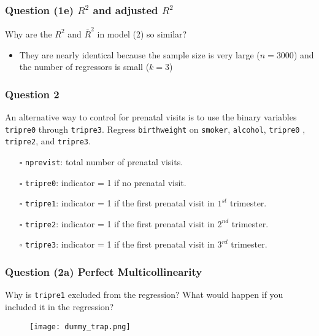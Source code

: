 \documentclass[11pt, xcolor=x11names,compress]{beamer}
\begin{document}
\begin{frame}[fragile,t]
\frametitle{Question (1e) $R^2$ and adjusted $R^2$}
\linespread{1.3}
Why are the $R^2$ and $\bar{R}^2$ in model (2) so similar?

\vspace{10mm}

\begin{itemize}
    \item They are nearly identical because the sample size is very large ($n = 3000$) and the number of regressors is small ($k = 3$)
\end{itemize}
\end{frame}

\begin{frame}[fragile,t]
\frametitle{Question 2}
\linespread{1.3}
An alternative way to control for prenatal visits is to use the binary variables \texttt{tripre0} through \texttt{tripre3}. Regress \texttt{birthweight} on \texttt{smoker}, \texttt{alcohol}, \texttt{tripre0} , \texttt{tripre2}, and \texttt{tripre3}.

\vspace{3mm}

\begin{itemize}
        \item [$\square$] \texttt{nprevist}: total number of prenatal visits.
        \item [$\square$] \texttt{tripre0}: indicator = 1 if no prenatal visit.
        \item [$\square$] \texttt{tripre1}: indicator = 1 if the first prenatal visit in $1^{st}$ trimester.
        \item [$\square$] \texttt{tripre2}: indicator = 1 if the first prenatal visit in $2^{nd}$ trimester.
        \item [$\square$] \texttt{tripre3}: indicator = 1 if the first prenatal visit in $3^{rd}$ trimester.        
\end{itemize}
\end{frame}

\begin{frame}[fragile,t]
\frametitle{Question (2a) Perfect Multicollinearity} 
Why is \texttt{tripre1} excluded from the regression? What would happen if you included it in the regression?
\pause
\begin{figure}
    \centering
    \texttt{[image: dummy\_trap.png]}
    \caption{}
    \label{fig:my_label}
\end{figure}
\end{frame}
\end{document}
